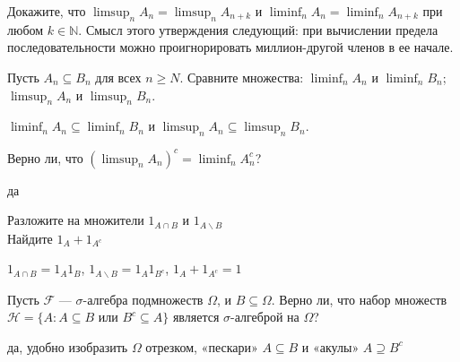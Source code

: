 \begin{problem}
Докажите, что $\limsup_{n}A_{n}=\limsup_{n}A_{n+k}$ и
$\liminf_{n}A_{n}=\liminf_{n}A_{n+k}$ при любом $k\in\mathbb{N}$.
Смысл этого утверждения следующий: при вычислении предела
последовательности можно проигнорировать миллион-другой членов в
ее начале.

\begin{sol}

\end{sol}
\end{problem}

\begin{problem}
Пусть $A_{n} \subseteq B_{n}$ для всех $n\ge N$. Сравните множества: $\liminf_{n}A_{n}$ и $\liminf_{n}B_{n}$;
$\limsup_{n}A_{n}$ и $\limsup_{n}B_{n}$.

\begin{sol}
$\liminf_{n}A_{n} \subseteq \liminf_{n}B_{n}$ и $\limsup_{n}A_{n}
\subseteq \limsup_{n}B_{n}$.
\end{sol}
\end{problem}

\begin{problem}
Верно ли, что $\left(\limsup_{n}A_{n}\right)^{c}=\liminf_{n}A_{n}^{c}$?

\begin{sol}
да
\end{sol}
\end{problem}

\begin{problem}
Разложите на множители $1_{A\cap B}$ и $1_{A\backslash B}$ \\
Найдите $1_{A}+1_{A^{c}}$

\begin{sol}
 $1_{A\cap B}=1_{A}1_{B}$, $1_{A\backslash B}=1_{A}1_{B^{c}}$, $1_{A}+1_{A^{c}}=1$
\end{sol}
\end{problem}

\begin{problem}
Пусть $\mathcal{F}$ — $\sigma$-алгебра подмножеств $\Omega$, и
$B\subseteq\Omega$. Верно ли, что набор множеств
$\mathcal{H}=\{A:A\subseteq B$ или $B^{c}\subseteq A\}$ является
$\sigma$-алгеброй на $\Omega$?

\begin{sol}
да, удобно изобразить $\Omega$ отрезком, «пескари» $A\subseteq B$ и «акулы» $A \supseteq B^{c}$
\end{sol}
\end{problem}

